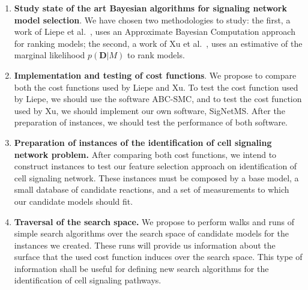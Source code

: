 \begin{enumerate}
    \item{{\bf Study state of the art Bayesian algorithms for signaling
        network model selection}. We have chosen two methodologies to
        study: the first, a work of Liepe et al.~\cite{Liepe2014}, uses
        an Approximate Bayesian Computation approach for ranking models;
        the second, a work of Xu et al.~\cite{Xura20}, uses an
        estimative of the marginal likelihood $p({\bm D}| M)$ to rank
        models.}
    \item{{\bf Implementation and testing of cost functions}. We propose
        to compare both the cost functions used by Liepe and Xu. To test
        the cost function used by Liepe, we should use the software
        ABC-SMC, and to test the cost function used by Xu, we should
        implement our own software, SigNetMS. After the preparation of
        instances, we should test the performance of both software.}
    \item{{\bf Preparation of instances of the identification of cell
        signaling network problem.} After comparing both cost functions,
        we intend to construct instances to test our feature selection
        approach on identification of cell signaling network. These
        instances must be composed by a base model, a small database of
        candidate reactions, and a set of measurements to which our
        candidate models should fit.}
    \item{{\bf Traversal of the search space.} We propose to perform
        walks and runs of simple search algorithms over the search space
        of candidate models for the instances we created. These runs
        will provide us information about the surface that the used cost 
        function induces over the search space. This type of information
        shall be useful for defining new search algorithms for the
        identification of cell signaling pathways.}
\end{enumerate}

